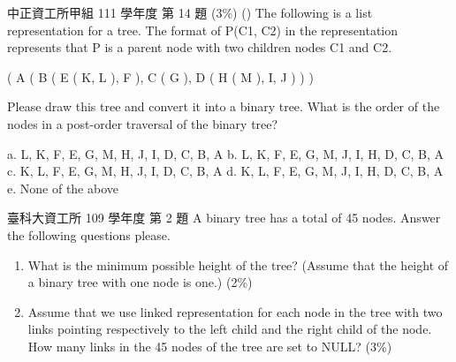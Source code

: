 \begin{pastexam}[label={px:bt-3}]{中正資工所甲組 111 學年度 第 14 題}
(3\%) (\quad) The following is a list representation for a tree. The format of P(C1, C2)
in the representation represents that P is a parent node with two children nodes C1 and
C2.
\begin{center}( A ( B ( E ( K, L ), F ), C ( G ), D ( H ( M ), I, J ) ) )\end{center}
\begin{center}
\end{center}
Please draw this tree and convert it into a binary tree. What is the order of the nodes in
a post-order traversal of the binary tree?

a. L, K, F, E, G, M, H, J, I, D, C, B, A \quad b. L, K, F, E, G, M, J, I, H, D, C, B, A\\
c. K, L, F, E, G, M, H, J, I, D, C, B, A \quad d. K, L, F, E, G, M, J, I, H, D, C, B, A\\
e. None of the above
\end{pastexam}

\begin{pastexam}[label={px:bt-4}]{臺科大資工所 109 學年度 第 2 題}
A binary tree has a total of 45 nodes. Answer the following questions please.
\begin{enumerate}[label=(\alph*)]
\item What is the minimum possible height of the tree? (Assume that the height of a
binary tree with one node is one.) (2\%)
\item Assume that we use linked representation for each node in the tree with two links
pointing respectively to the left child and the right child of the node. How many links
in the 45 nodes of the tree are set to NULL? (3\%)
\end{enumerate}
\end{pastexam}

